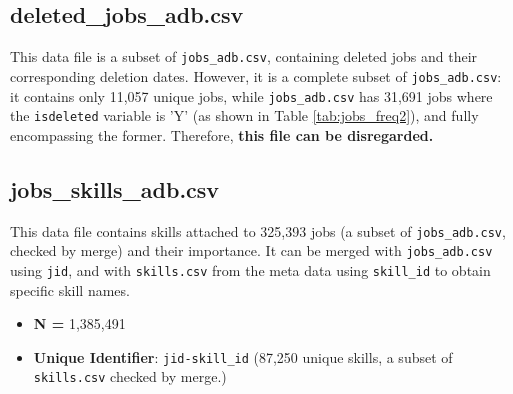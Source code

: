 \documentclass[12pt]{article}
\begin{document}
\subsection{deleted\_jobs\_adb.csv}

This data file is a subset of \texttt{jobs\_adb.csv}, containing deleted jobs and their corresponding deletion dates. However, it is a complete subset of \texttt{jobs\_adb.csv}: it contains only 11,057 unique jobs, while \texttt{jobs\_adb.csv} has 31,691 jobs where the \texttt{isdeleted} variable is 'Y' (as shown in Table \ref{tab:jobs_freq2}), and fully encompassing the former. Therefore, \textbf{this file can be disregarded.}







\subsection{jobs\_skills\_adb.csv}
This data file contains skills attached to 325,393 jobs (a subset of \texttt{jobs\_adb.csv}, checked by merge) and their importance. It can be merged with \texttt{jobs\_adb.csv} using \texttt{jid}, and with \texttt{skills.csv} from the meta data using \texttt{skill\_id} to obtain specific skill names.

\begin{itemize}
    \item \textbf{N = }1,385,491
    \item \textbf{Unique Identifier}: \texttt{jid-skill\_id} (87,250 unique skills, a subset of \texttt{skills.csv} checked by merge.)
\end{itemize}
\end{document}
